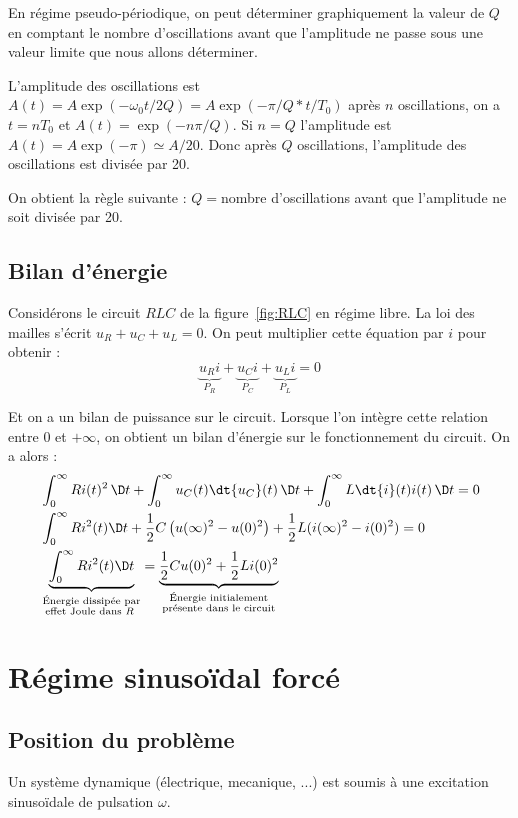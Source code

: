 \documentclass{cours}
\begin{document}
\begin{itemize}
En régime pseudo-périodique, on peut déterminer graphiquement la valeur de $Q$ en comptant le nombre d'oscillations avant que l'amplitude ne passe sous une valeur limite que nous allons déterminer.

L'amplitude des oscillations est $A(t)=A\exp(-\omega_0t/2Q)=A\exp(-\pi/Q*t/T_0)$ après $n$ oscillations, on a $t=nT_0$ et $A(t)=\exp(-n\pi/Q)$. Si $n=Q$ l'amplitude est $A(t)=A\exp(-\pi)\simeq A/20$. Donc après $Q$
 oscillations, l'amplitude des oscillations est divisée par 20.

On obtient la règle suivante : $Q=$nombre d'oscillations avant que l'amplitude ne soit divisée par 20.
\end{itemize}

\subsection{Bilan d'énergie}
Considérons le circuit $RLC$ de la figure~\ref{fig:RLC} en régime libre. La loi des mailles s'écrit $u_R + u_C + u_L = 0$. On peut multiplier cette équation par $i$ pour obtenir :
\begin{equation}
  \underbrace{u_Ri}_{P_R} + \underbrace{u_Ci}_{P_C} + \underbrace{u_Li}_{P_L} = 0
\end{equation}

Et on a un bilan de puissance sur le circuit. Lorsque l'on intègre cette relation entre $0$ et $+\infty$, on obtient un bilan d'énergie sur le fonctionnement du circuit. On a alors :
\begin{align}
  &\int_0^\infty Ri(t)^2 \, \D t + \int_0^\infty u_C(t) \dt{u_C}(t)\,  \D t + \int_0^\infty L \dt{i}(t) i(t)\,  \D t = 0 \\
  & \int_0^\infty Ri^2(t) \D t + \frac{1}{2}C\left(u(\infty)^2 - u(0)^2  \right) + \frac{1}{2}L(i(\infty)^2-i(0)^2) =0 \\
  & \underbrace{\int_0^\infty Ri^2(t) \D t}_{\substack{\text{Énergie dissipée par}\\ \text{effet Joule dans $R$ }}} =  \underbrace{\frac{1}{2}Cu(0)^2 + \frac{1}{2}Li(0)^2}_{\substack{\text{Énergie initialement}\\ \text{présente dans le circuit}}}
\end{align}

\section{Régime sinusoïdal forcé}
\subsection{Position du problème}
Un système dynamique (électrique, mecanique, ...) est soumis à une excitation sinusoïdale de pulsation $\omega$.
\end{document}
